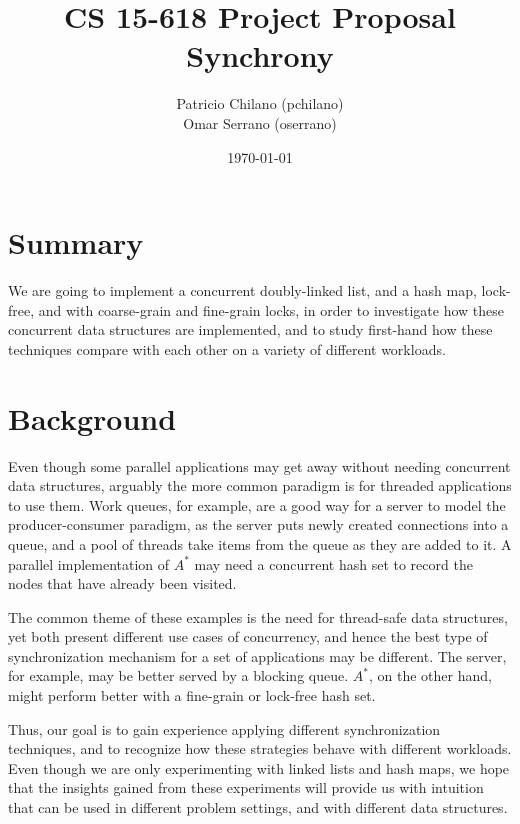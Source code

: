 \documentclass[11pt]{article}
\title{\vspace{-25pt}
\huge CS 15-618 Project Proposal \\
\huge Synchrony
}
\author{
    Patricio Chilano (pchilano) \\
    Omar Serrano (oserrano)
}
\date{\today}
\begin{document}


\maketitle

\section*{Summary}
We are going to implement a concurrent doubly-linked list, and a hash map,
lock-free, and with coarse-grain and fine-grain locks, in order to
investigate how these concurrent data structures are implemented, and to study
first-hand how these techniques compare with each other on a variety of
different workloads.

\section*{Background}
Even though some parallel applications may get away without needing concurrent
data structures, arguably the more common paradigm is for threaded applications
to use them. Work queues, for example, are a good way for a server to model the
producer-consumer paradigm, as the server puts newly created connections into a
queue, and a pool of threads take items from the queue as they are added to it.
A parallel implementation of $A^*$ may need a concurrent hash set to record the
nodes that have already been visited.

The common theme of these examples is the need for thread-safe data structures,
yet both present different use cases of concurrency, and hence the best type of
synchronization mechanism for a set of applications may be different. The
server, for example, may be better served by a blocking queue. $A^*$, on the
other hand, might perform better with a fine-grain or lock-free hash set.

Thus, our goal is to gain experience applying different synchronization
techniques, and to recognize how these strategies behave with different
workloads. Even though we are only experimenting with linked lists and hash
maps, we hope that the insights gained from these experiments will provide us
with intuition that can be used in different problem settings, and with
different data structures.
\end{document}
